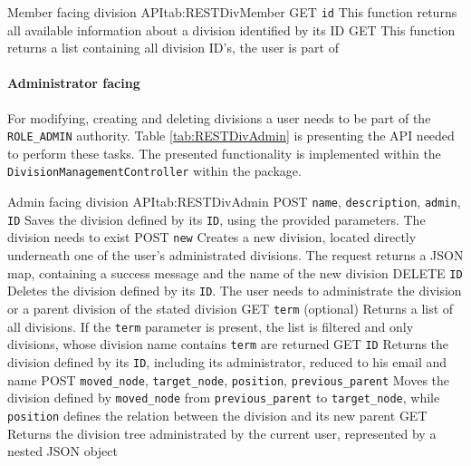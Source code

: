\begin{RESTTable}{Member facing division API}{tab:RESTDivMember}
		{GET}
		{\texttt{id}}
		{This function returns all available information about a division identified by its ID}
		{GET}
		{}
		{This function returns a list containing all division ID's, the user is part of}
\end{RESTTable}

\paragraph{Administrator facing}
For modifying, creating and deleting divisions a user needs to be part of the \texttt{ROLE\_ADMIN} authority. Table \vref{tab:RESTDivAdmin} is presenting the \gls{API} needed to perform these tasks. The presented functionality is implemented within the \texttt{DivisionManagementController} within the  package.

\begin{RESTTable}{Admin facing division API}{tab:RESTDivAdmin}
		{POST}
		{\texttt{name}, \texttt{description}, \texttt{admin}, \texttt{ID}}
		{Saves the division defined by its \texttt{ID}, using the provided parameters. The division needs to exist}
		{POST} 
		{\texttt{new}}
		{Creates a new division, located directly underneath one of the user's administrated divisions. The request returns a JSON map, containing a success message and the name of the new division}
		{DELETE}
		{\texttt{ID}}
		{Deletes the division defined by its \texttt{ID}. The user needs to administrate the division or a parent division of the stated division}
		{GET}
		{\texttt{term} (optional)}
		{Returns a list of all divisions. If the \texttt{term} parameter is present, the list is filtered and only divisions, whose division name contains \texttt{term} are returned}
		{GET}
		{\texttt{ID}}
		{Returns the division defined by its \texttt{ID}, including its administrator, reduced to his email and name}
		{POST}
		{\texttt{moved\_node}, \texttt{target\_node}, \texttt{position}, \texttt{previous\_parent}}
		{Moves the division defined by \texttt{moved\_node} from \texttt{previous\_parent} to \texttt{target\_node}, while \texttt{position} defines the relation between the division and its new parent}
		{GET}
		{} 
		{Returns the division tree administrated by the current user, represented by a nested JSON object}
\end{RESTTable}

